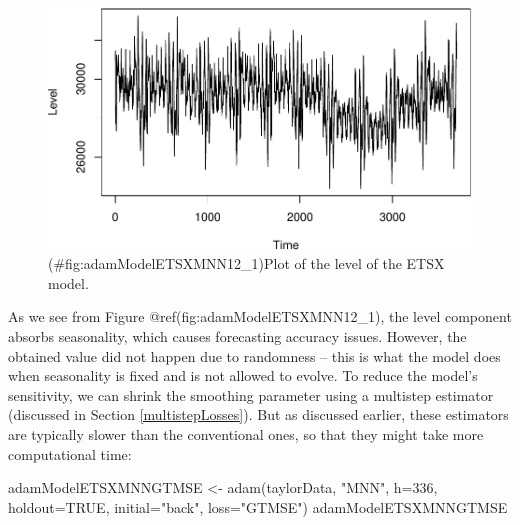 \documentclass[
]{book}
\newenvironment{Shaded}{\begin{snugshade}}{\end{snugshade}}
\newcommand{\AttributeTok}[1]{\textcolor[rgb]{0.77,0.63,0.00}{#1}}
\newcommand{\ConstantTok}[1]{\textcolor[rgb]{0.00,0.00,0.00}{#1}}
\newcommand{\DecValTok}[1]{\textcolor[rgb]{0.00,0.00,0.81}{#1}}
\newcommand{\FunctionTok}[1]{\textcolor[rgb]{0.00,0.00,0.00}{#1}}
\newcommand{\NormalTok}[1]{#1}
\newcommand{\OtherTok}[1]{\textcolor[rgb]{0.56,0.35,0.01}{#1}}
\newcommand{\SpecialCharTok}[1]{\textcolor[rgb]{0.00,0.00,0.00}{#1}}
\newcommand{\StringTok}[1]{\textcolor[rgb]{0.31,0.60,0.02}{#1}}
\theoremstyle{definition}
\theoremstyle{definition}
\theoremstyle{definition}
\theoremstyle{definition}
\theoremstyle{remark}
\begin{document}
\begin{Shaded}
\end{Shaded}

\begin{figure}
\centering
\includegraphics{Svetunkov--2022----ADAM_files/figure-latex/adamModelETSXMNN12_1-1.pdf}
\caption{(\#fig:adamModelETSXMNN12\_1)Plot of the level of the ETSX model.}
\end{figure}

As we see from Figure @ref(fig:adamModelETSXMNN12\_1), the level component absorbs seasonality, which causes forecasting accuracy issues. However, the obtained value did not happen due to randomness -- this is what the model does when seasonality is fixed and is not allowed to evolve. To reduce the model's sensitivity, we can shrink the smoothing parameter using a multistep estimator (discussed in Section \ref{multistepLosses}). But as discussed earlier, these estimators are typically slower than the conventional ones, so that they might take more computational time:

\begin{Shaded}
\begin{Highlighting}[]
\NormalTok{adamModelETSXMNNGTMSE }\OtherTok{\textless{}{-}} \FunctionTok{adam}\NormalTok{(taylorData, }\StringTok{"MNN"}\NormalTok{,}
                              \AttributeTok{h=}\DecValTok{336}\NormalTok{, }\AttributeTok{holdout=}\ConstantTok{TRUE}\NormalTok{,}
                              \AttributeTok{initial=}\StringTok{"back"}\NormalTok{, }\AttributeTok{loss=}\StringTok{"GTMSE"}\NormalTok{)}
\NormalTok{adamModelETSXMNNGTMSE}
\end{Highlighting}
\end{Shaded}
\end{document}
